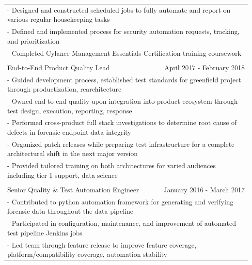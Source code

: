 \documentclass[letterpaper]{article}
\begin{document}
\begin{center}
\begin{tabular}{p{}p{}r}
			\\
				\multicolumn{3}{p{\textwidth}}{\quad\quad - Designed and constructed scheduled jobs to fully automate and report on various regular housekeeping tasks}
			\\
				\multicolumn{3}{p{\textwidth}}{\quad\quad - Defined and implemented process for security automation requests, tracking, and prioritization}
			\\
				\multicolumn{3}{p{\textwidth}}{\quad\quad - Completed Cylance Management Essentials Certification training coursework}
			\\
		  \\		%
			  \multicolumn{2}{p{0.5\textwidth}}{\quad End-to-End Product Quality Lead}
			  &
			  {April 2017 - February 2018 \quad\quad\quad\quad}
		  \\
			  \multicolumn{3}{p{\textwidth}}{\quad\quad - Guided development process, established test standards for greenfield project through productization, rearchitecture} 
		  \\
			  \multicolumn{3}{p{\textwidth}}{\quad\quad - Owned end-to-end quality upon integration into product ecosystem through test design, execution, reporting, response} 
		  \\
			  \multicolumn{3}{p{\textwidth}}{\quad\quad - Performed cross-product full stack investigations to determine root cause of defects in forensic endpoint data integrity} 
		  \\
			  \multicolumn{3}{p{\textwidth}}{\quad\quad - Organized patch releases while preparing test infrastructure for a complete architectural shift in the next major version} 
		  \\
			  \multicolumn{3}{p{\textwidth}}{\quad\quad - Provided tailored training on both architectures for varied audiences including tier 1 support, data science}
		  \\
		  \\
			  \multicolumn{2}{p{0.5\textwidth}}{\quad Senior Quality \& Test Automation Engineer}
			  &
			  {January 2016 - March 2017 \quad\quad\quad\quad}
		  \\
			  \multicolumn{3}{p{\textwidth}}{\quad\quad - Contributed to python automation framework for generating and verifying forensic data throughout the data pipeline} 
		  \\
			  \multicolumn{3}{p{\textwidth}}{\quad\quad - Participated in configuration, maintenance, and improvement of automated test pipeline Jenkins jobs}
		  \\
			  \multicolumn{3}{p{\textwidth}}{\quad\quad - Led team through feature release to improve feature coverage, platform/compatibility coverage, automation stability}  

\end{tabular}
\end{center}
\end{document}
